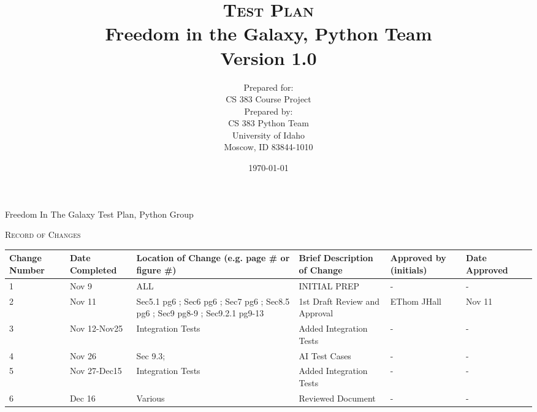 \documentclass[report]{article}
\begin{document}
\title{\textsc{Test Plan}
  \\ Freedom in the Galaxy, Python Team
  \vspace{10 mm}
  \\ Version 1.0
  \vspace{10 mm}}
  
\date{\today}

\author{Prepared for:
  \\ CS 383 Course Project
  \vspace{10 mm}
  \\Prepared by:
  \\ CS 383 Python Team
  \\ University of Idaho
  \\ Moscow, ID 83844-1010
  \vspace{10 mm}}


\maketitle
\newpage 

\begin{center}
\noindent Freedom In The Galaxy Test Plan, Python Group

\vspace{10 mm}

\noindent \textsc{Record of Changes}   

\vspace{10 mm}


\begin{tabularx}{\textwidth}{| X | X | X | X | X | X | X |}
  \hline
  \textbf{Change Number} &
    \textbf{Date Completed} &
    \textbf{Location of Change (e.g. page \# or figure \#)} &
    \textbf{Brief Description of Change} &
    \textbf{Approved by (initials)} &
    \textbf{Date Approved} 
    \\ \hline 1 & Nov 9 & ALL  & INITIAL PREP & - & -
    \\ \hline 2 & Nov 11 & Sec5.1 pg6 ; Sec6 pg6 ; Sec7 pg6 ; Sec8.5 pg6 ; Sec9 pg8-9 ; Sec9.2.1 pg9-13 & 1st Draft Review and Approval & EThom JHall & Nov 11  
    \\ \hline 3 & Nov 12-Nov25 & Integration Tests & Added Integration Tests & - & -
    \\ \hline 4 & Nov 26 & Sec 9.3;  & AI Test Cases & - & -
    \\ \hline 5 & Nov 27-Dec15 & Integration Tests & Added Integration Tests & - & -
    \\ \hline 6 & Dec 16 & Various & Reviewed Document & - & -

    \\ \hline
\end{tabularx}
\end{center}
\newpage 
\tableofcontents
\newpage
\end{document}

